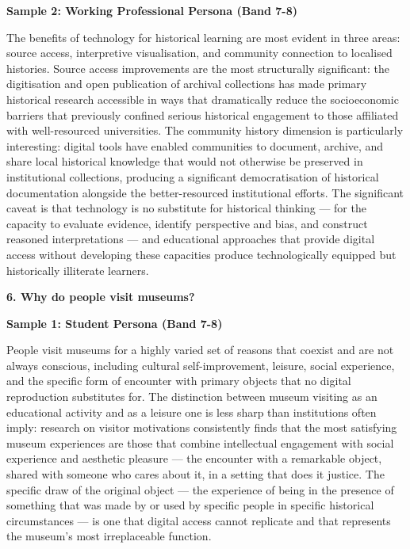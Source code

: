 \textbf{Sample 2: Working Professional Persona (Band 7-8)}

The benefits of technology for historical learning are most evident in three areas: source access, interpretive visualisation, and community connection to localised histories. Source access improvements are the most structurally significant: the digitisation and open publication of archival collections has made primary historical research accessible in ways that dramatically reduce the socioeconomic barriers that previously confined serious historical engagement to those affiliated with well-resourced universities. The community history dimension is particularly interesting: digital tools have enabled communities to document, archive, and share local historical knowledge that would not otherwise be preserved in institutional collections, producing a significant democratisation of historical documentation alongside the better-resourced institutional efforts. The significant caveat is that technology is no substitute for historical thinking — for the capacity to evaluate evidence, identify perspective and bias, and construct reasoned interpretations — and educational approaches that provide digital access without developing these capacities produce technologically equipped but historically illiterate learners.

\separator

\begin{ieltsquestion}
\textbf{6. Why do people visit museums?}
\end{ieltsquestion}
\textbf{Sample 1: Student Persona (Band 7-8)}

People visit museums for a highly varied set of reasons that coexist and are not always conscious, including cultural self-improvement, leisure, social experience, and the specific form of encounter with primary objects that no digital reproduction substitutes for. The distinction between museum visiting as an educational activity and as a leisure one is less sharp than institutions often imply: research on visitor motivations consistently finds that the most satisfying museum experiences are those that combine intellectual engagement with social experience and aesthetic pleasure — the encounter with a remarkable object, shared with someone who cares about it, in a setting that does it justice. The specific draw of the original object — the experience of being in the presence of something that was made by or used by specific people in specific historical circumstances — is one that digital access cannot replicate and that represents the museum's most irreplaceable function.

